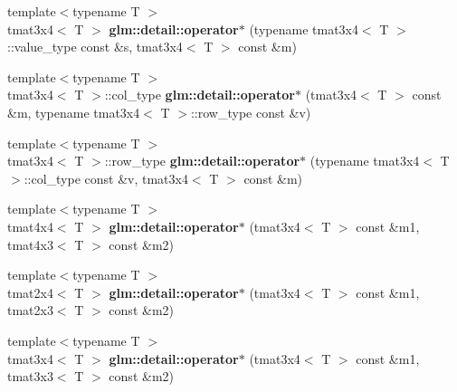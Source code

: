 \begin{DoxyCompactItemize}
\item 
\hypertarget{namespaceglm_1_1detail_a6fb30e4e0ea76f78b8bf695827b0f2fe}{{\footnotesize template$<$typename T $>$ }\\tmat3x4$<$ \-T $>$ {\bfseries glm\-::detail\-::operator$\ast$} (typename tmat3x4$<$ \-T $>$\-::value\-\_\-type const \&s, tmat3x4$<$ \-T $>$ const \&m)}\label{namespaceglm_1_1detail_a6fb30e4e0ea76f78b8bf695827b0f2fe}

\item 
\hypertarget{namespaceglm_1_1detail_a70e73732943ad8e15f77b8e27f01e059}{{\footnotesize template$<$typename T $>$ }\\tmat3x4$<$ \-T $>$\-::col\-\_\-type {\bfseries glm\-::detail\-::operator$\ast$} (tmat3x4$<$ \-T $>$ const \&m, typename tmat3x4$<$ \-T $>$\-::row\-\_\-type const \&v)}\label{namespaceglm_1_1detail_a70e73732943ad8e15f77b8e27f01e059}

\item 
\hypertarget{namespaceglm_1_1detail_a2e09c4feb73c8d58f755cc756a906712}{{\footnotesize template$<$typename T $>$ }\\tmat3x4$<$ \-T $>$\-::row\-\_\-type {\bfseries glm\-::detail\-::operator$\ast$} (typename tmat3x4$<$ \-T $>$\-::col\-\_\-type const \&v, tmat3x4$<$ \-T $>$ const \&m)}\label{namespaceglm_1_1detail_a2e09c4feb73c8d58f755cc756a906712}

\item 
\hypertarget{namespaceglm_1_1detail_a96363f2e8d320cb39e7bb8734f964e2c}{{\footnotesize template$<$typename T $>$ }\\tmat4x4$<$ \-T $>$ {\bfseries glm\-::detail\-::operator$\ast$} (tmat3x4$<$ \-T $>$ const \&m1, tmat4x3$<$ \-T $>$ const \&m2)}\label{namespaceglm_1_1detail_a96363f2e8d320cb39e7bb8734f964e2c}

\item 
\hypertarget{namespaceglm_1_1detail_a781d6622089be2d8abd2f26027b1ef5e}{{\footnotesize template$<$typename T $>$ }\\tmat2x4$<$ \-T $>$ {\bfseries glm\-::detail\-::operator$\ast$} (tmat3x4$<$ \-T $>$ const \&m1, tmat2x3$<$ \-T $>$ const \&m2)}\label{namespaceglm_1_1detail_a781d6622089be2d8abd2f26027b1ef5e}

\item 
\hypertarget{namespaceglm_1_1detail_a2e520a1f6236aafb5e65d8a7cca5ef0e}{{\footnotesize template$<$typename T $>$ }\\tmat3x4$<$ \-T $>$ {\bfseries glm\-::detail\-::operator$\ast$} (tmat3x4$<$ \-T $>$ const \&m1, tmat3x3$<$ \-T $>$ const \&m2)}\label{namespaceglm_1_1detail_a2e520a1f6236aafb5e65d8a7cca5ef0e}


\end{DoxyCompactItemize}
